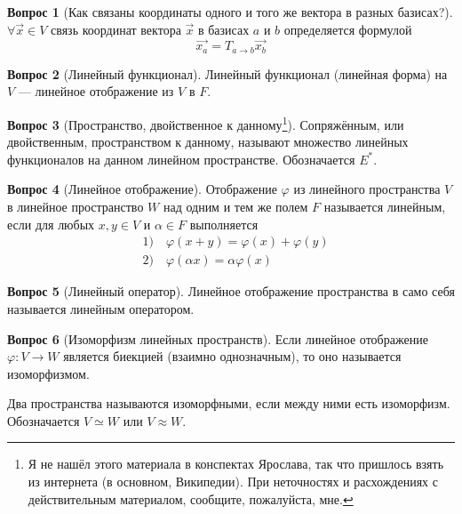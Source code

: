 \documentclass[a4paper,11pt]{article}
\theoremstyle{remark}
\theoremstyle{definition}
\newtheorem{question}{Вопрос}
\begin{document}
\begin{question}[Как связаны координаты одного и того же вектора в разных базисах?]
\(\forall \vec{x} \in V\) связь координат вектора \(\vec{x}\) в базисах \(a\) и \(b\) определяется формулой
\begin{equation*}
     \vec{x_a} = T_{a \rightarrow b}\vec{x_b}
\end{equation*} 
\end{question}


\begin{question}[Линейный функционал]
Линейный функционал (линейная форма) на \(V\) --- линейное отображение из \(V\) в \(F\).
\end{question}


\begin{question}[Пространство, двойственное к данному\footnote{\label{notfound}Я не нашёл этого материала в конспектах Ярослава, так что пришлось взять из интернета (в основном, Википедии). При неточностях и расхождениях с действительным материалом, сообщите, пожалуйста, мне.}]
Сопряжённым, или двойственным, пространством к данному, называют множество линейных функционалов на данном линейном пространстве. Обозначается \(E^*\).
\end{question}


\begin{question}[Линейное отображение]
Отображение \(\varphi\) из линейного пространства \(V\) в линейное пространство \(W\) над одним и тем же полем \(F\) называется линейным, если для любых \(x, y \in V\) и \(\alpha \in F\) выполняется
\begin{align*}
    &1)\quad\varphi(x + y) = \varphi(x) + \varphi(y) \\
    &2)\quad\varphi(\alpha{}x) = \alpha\varphi{}(x)
\end{align*}
\end{question}


\begin{question}[Линейный оператор]
Линейное отображение пространства в само себя называется линейным оператором.
\end{question}


\begin{question}[Изоморфизм линейных пространств]
Если линейное отображение \(\varphi: V \rightarrow W\) является биекцией (взаимно однозначным), то оно называется изоморфизмом. 

Два пространства называются изоморфными, если между ними есть изоморфизм. Обозначается \(V \simeq W\) или \(V \approx W\).
\end{question}
\end{document}
